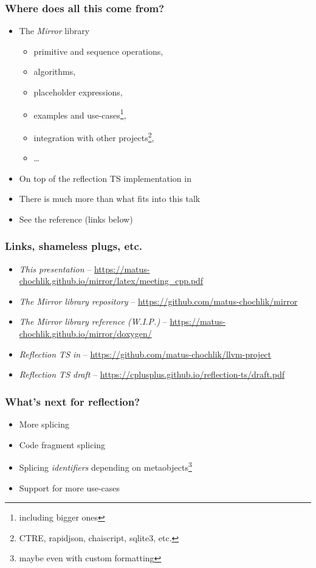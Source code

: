 \documentclass[aspectratio=169,compress,table,xcolor=table]{beamer}
\begin{document}
\begin{frame}
  \frametitle{Where does all this come from?}
  \larger
  \begin{itemize}
    \item The {\em Mirror} library
    \begin{itemize}
      \item primitive and sequence operations,
      \item algorithms,
      \item placeholder expressions,
      \item examples and use-cases\footnote{including bigger ones},
      \item integration with other projects\footnote{CTRE, rapidjson, chaiscript,
        sqlite3, etc.},
      \item \ldots
    \end{itemize}
    \item On top of the reflection TS implementation in 
    \item There is much more than what fits into this talk
    \item See the reference (links below)
  \end{itemize}
\end{frame}
\begin{frame}
  \frametitle{Links, shameless plugs, etc.}
  \smaller
  \begin{itemize}
    \item {\em This presentation} --
      \url{https://matus-chochlik.github.io/mirror/latex/meeting_cpp.pdf}
    \item {\em The Mirror library repository} --
      \url{https://github.com/matus-chochlik/mirror}
    \item {\em The Mirror library reference (W.I.P.)} --
      \url{https://matus-chochlik.github.io/mirror/doxygen/}
    \item {\em Reflection TS in } --
      \url{https://github.com/matus-chochlik/llvm-project}
    \item {\em Reflection TS draft} --
      \url{https://cplusplus.github.io/reflection-ts/draft.pdf}
  \end{itemize}
\end{frame}
\begin{frame}
  \frametitle{What's next for reflection?}
  \Large
  \begin{itemize}
    \item More splicing
    \item Code fragment splicing
    \item Splicing {\em \larger identifiers} depending on metaobjects\footnote{
        maybe even with custom formatting}
    \item Support for more use-cases
  \end{itemize}
\end{frame}
\end{document}
